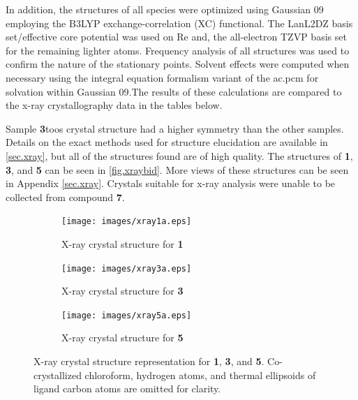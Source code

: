 

In addition, the structures of all species were optimized using Gaussian 09\autocite{gaussian} employing the B3LYP\autocite{becke1993, lee1988}  exchange-correlation (XC) functional. The LanL2DZ basis set/effective core potential\autocite{hay1985} was used on Re and, the all-electron TZVP basis set\autocite{schafer1994} for the remaining lighter atoms. Frequency analysis of all structures was used to confirm the nature of the stationary points. Solvent effects were computed when necessary using the integral equation formalism variant of the \gls{ac.pcm} for solvation within Gaussian 09\autocite{tomasi2005, scalmani2006}.The results of these calculations are compared to the x-ray crystallography data in the tables below.


Sample \textbf{3}toos crystal structure had a higher symmetry than the other samples. Details on the exact methods used for structure elucidation are available in \autoref{sec.xray}, but all of the structures found are of high quality. The structures of \textbf{1}, \textbf{3}, and \textbf{5} can be seen in \autoref{fig.xraybid}. More views of these structures can be seen in Appendix \autoref{sec.xray}. Crystals suitable for x-ray analysis were unable to be collected from compound \textbf{7}. 

\begin{figure}[!ht]
 \centering
 \begin{subfigure}[b]{0.49\textwidth}
  \texttt{[image: images/xray1a.eps]}
  \caption{X-ray crystal structure for \textbf{1}}
  \label{fig.da1}
 \end{subfigure}
 \begin{subfigure}[b]{0.49\textwidth}
  \texttt{[image: images/xray3a.eps]}
  \caption{X-ray crystal structure for \textbf{3}}
  \label{fig.da3}
 \end{subfigure}
 \begin{subfigure}[b]{0.49\textwidth}
  \texttt{[image: images/xray5a.eps]}
  \caption{X-ray crystal structure for \textbf{5}}
  \label{fig.da5}
 \end{subfigure}
\caption[X-ray crystal structure representation for \textbf{1}, \textbf{3} and \textbf{5}.]{X-ray crystal structure representation for \textbf{1}, \textbf{3}, and \textbf{5}. Co-crystallized chloroform, hydrogen atoms, and thermal ellipsoids of ligand carbon atoms are omitted for clarity.}
\label{fig.xraybid}
\end{figure} 

